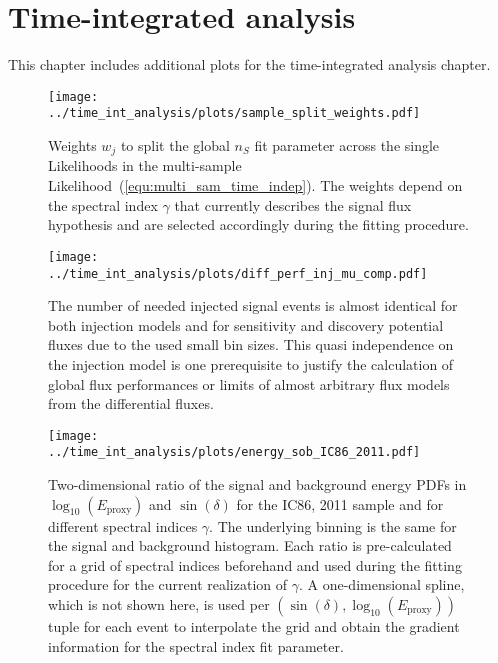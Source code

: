 \section{Time-integrated analysis}
This chapter includes additional plots for the time-integrated analysis chapter.
\begin{figure}[H]
  \centering
  \texttt{[image: ../time\_int\_analysis/plots/sample\_split\_weights.pdf]}
  \caption[Signal split weights for the time-integrated analysis]{
    Weights $w_j$ to split the global $n_S$ fit parameter across the single Likelihoods in the multi-sample Likelihood~(\ref{equ:multi_sam_time_indep}).
    The weights depend on the spectral index $\gamma$ that currently describes the signal flux hypothesis and are selected accordingly during the fitting procedure.
  }
  \label{fig:sample_split_weights}
\end{figure}
\enlargethispage*{5cm}
\begin{figure}[H]
  \centering
  \texttt{[image: ../time\_int\_analysis/plots/diff\_perf\_inj\_mu\_comp.pdf]}
  \caption[Injected signal events for the time-integrated diff. performance fluxes]{
    The number of needed injected signal events is almost identical for both injection models and for sensitivity and discovery potential fluxes due to the used small bin sizes.
    This quasi independence on the injection model is one prerequisite to justify the calculation of global flux performances or limits of almost arbitrary flux models from the differential fluxes.
  }
  \label{fig:tindep_diff_perf_inj_mu_comp}
\end{figure}


\begin{figure}[H]
  \centering
  \texttt{[image: ../time\_int\_analysis/plots/energy\_sob\_IC86\_2011.pdf]}
  \caption[Energy PDF for the time-integrated analysis for IC86, 2011]{
    Two-dimensional ratio of the signal and background energy PDFs in $\log_{10}\left(E_\text{proxy}\right)$ and $\sin(\delta)$ for the IC86, 2011 sample and for different spectral indices $\gamma$.
    The underlying binning is the same for the signal and background histogram.
    Each ratio is pre-calculated for a grid of spectral indices beforehand and used during the fitting procedure for the current realization of $\gamma$.
    A one-dimensional spline, which is not shown here, is used per $\left(\sin(\delta), \log_{10}\left(E_\text{proxy}\right)\right)$ tuple for each event to interpolate the grid and obtain the gradient information for the spectral index fit parameter.
  }
  \label{fig:tindep_energy_sob_IC86_2011}
\end{figure}

